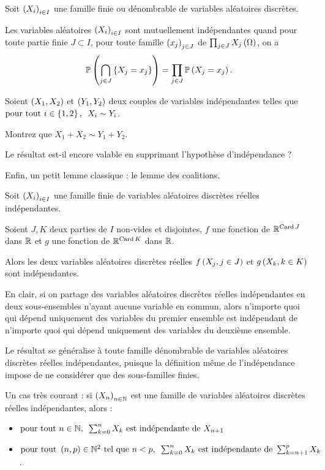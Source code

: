 \begin{prop}
Soit \(\left(X_i\right)_{i\in I}\) une famille finie ou dénombrable de variables aléatoires discrètes.

Les variables aléatoires \(\left(X_i\right)_{i\in I}\) sont mutuellement indépendantes quand pour toute partie finie \(J\subset I\), pour toute famille \(\left(x_j\right)_{j\in J}\) de \(\prod_{j\in J}X_j\left(\Omega\right)\), on a \[\mathbb{P}\left(\bigcap_{j\in J}\left\lbrace X_j=x_j\right\rbrace\right)=\prod_{j\in J}\mathbb{P}\left(X_j=x_j\right).\]
\end{prop}

\begin{exo}
Soient \(\left(X_1,X_2\right)\) et \(\left(Y_1,Y_2\right)\) deux couples de variables indépendantes telles que \(\quantifs{\tpt i\in\accol{1,2}}X_i\sim Y_i\).

Montrez que \(X_1+X_2\sim Y_1+Y_2\).

Le résultat est-il encore valable en supprimant l'hypothèse d'indépendance ?
\end{exo}

Enfin, un petit lemme classique : le lemme des coalitions.

\begin{prop}
Soit \(\left(X_i\right)_{i\in I}\) une famille finie de variables aléatoires discrètes réelles indépendantes.

Soient \(J,K\) deux parties de \(I\) non-vides et disjointes, \(f\) une fonction de \(\mathbb{R}^{\operatorname{Card} J}\) dans \(\mathbb{R}\) et \(g\) une fonction de \(\mathbb{R}^{\operatorname{Card} K}\) dans \(\mathbb{R}\).

Alors les deux variables aléatoires discrètes réelles \(f\left(X_j,j\in J\right)\) et \(g\left(X_k,k\in K\right)\) sont indépendantes.
\end{prop}

En clair, si on partage des variables aléatoires discrètes réelles indépendantes en deux sous-ensembles n'ayant aucune variable en commun, alors n'importe quoi qui dépend uniquement des variables du premier ensemble est indépendant de n'importe quoi qui dépend uniquement des variables du deuxième ensemble.

Le résultat se généralise à toute famille dénombrable de variables aléatoires discrètes réelles indépendantes, puisque la définition même de l'indépendance impose de ne considérer que des sous-familles finies.

\begin{ex}
Un cas très courant : si \(\left(X_n\right)_{n\in\mathbb{N}}\) est une famille de variables aléatoires discrètes réelles indépendantes, alors :

\begin{itemize}
    \item \(\quantifs{\tpt n\in\N}\sum_{k=0}^nX_k\text{ est indépendante de }X_{n+1}\) \\
    \item \(\quantifs{\tpt\paren{n,p}\in\N^2\text{ tel que }n<p}\sum_{k=0}^nX_k\text{ est indépendante de }\sum_{k=n+1}^pX_k\).
\end{itemize}
\end{ex}

